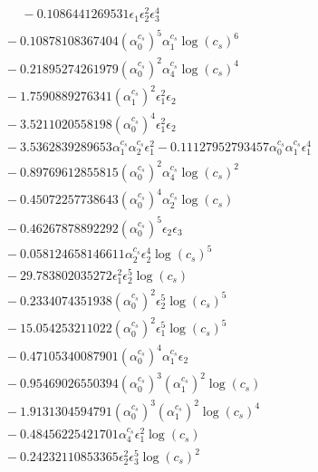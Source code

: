 \documentclass[10pt]{article}
\begin{document}
\begin{align*}
\phantom{F_{s,7}} &\phantom{={}}{}  - 0.1086441269531 \epsilon_{1} \epsilon_{2}^{2} \epsilon_{3}^{4} \\
&{}  - 0.10878108367404 \left(\alpha_{0}^{c_s}\right)^{5} \alpha_{1}^{c_s} \log{\left(c_{s} \right)}^{6} \\
&{}  - 0.21895274261979 \left(\alpha_{0}^{c_s}\right)^{2} \alpha_{4}^{c_s} \log{\left(c_{s} \right)}^{4} \\
&{}  - 1.7590889276341 \left(\alpha_{1}^{c_s}\right)^{2} \epsilon_{1}^{2} \epsilon_{2} \\
&{}  - 3.5211020558198 \left(\alpha_{0}^{c_s}\right)^{4} \epsilon_{1}^{2} \epsilon_{2} \\
&{}  - 3.5362839289653 \alpha_{1}^{c_s} \alpha_{2}^{c_s} \epsilon_{1}^{2} - 0.11127952793457 \alpha_{0}^{c_s} \alpha_{1}^{c_s} \epsilon_{1}^{4} \\
&{}  - 0.89769612855815 \left(\alpha_{0}^{c_s}\right)^{2} \alpha_{4}^{c_s} \log{\left(c_{s} \right)}^{2} \\
&{}  - 0.45072257738643 \left(\alpha_{0}^{c_s}\right)^{4} \alpha_{2}^{c_s} \log{\left(c_{s} \right)} \\
&{}  - 0.46267878892292 \left(\alpha_{0}^{c_s}\right)^{5} \epsilon_{2} \epsilon_{3} \\
&{}  - 0.058124658146611 \alpha_{2}^{c_s} \epsilon_{2}^{4} \log{\left(c_{s} \right)}^{5} \\
&{}  - 29.783802035272 \epsilon_{1}^{2} \epsilon_{2}^{5} \log{\left(c_{s} \right)} \\
&{}  - 0.2334074351938 \left(\alpha_{0}^{c_s}\right)^{2} \epsilon_{2}^{5} \log{\left(c_{s} \right)}^{5} \\
&{}  - 15.054253211022 \left(\alpha_{0}^{c_s}\right)^{2} \epsilon_{1}^{5} \log{\left(c_{s} \right)}^{5} \\
&{}  - 0.47105340087901 \left(\alpha_{0}^{c_s}\right)^{4} \alpha_{1}^{c_s} \epsilon_{2} \\
&{}  - 0.95469026550394 \left(\alpha_{0}^{c_s}\right)^{3} \left(\alpha_{1}^{c_s}\right)^{2} \log{\left(c_{s} \right)} \\
&{}  - 1.9131304594791 \left(\alpha_{0}^{c_s}\right)^{3} \left(\alpha_{1}^{c_s}\right)^{2} \log{\left(c_{s} \right)}^{4} \\
&{}  - 0.48456225421701 \alpha_{4}^{c_s} \epsilon_{1}^{2} \log{\left(c_{s} \right)} \\
&{}  - 0.24232110853365 \epsilon_{2}^{2} \epsilon_{3}^{5} \log{\left(c_{s} \right)}^{2} \\

\end{align*}
\end{document}
